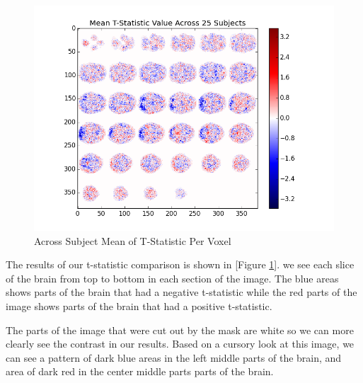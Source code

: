 
\begin{figure}[ht]

\centering

\includegraphics[scale=0.5]{images/hypothesis_testing}  

\caption{Across Subject Mean of T-Statistic Per Voxel}

\label{fig:mask}

\end{figure}


\par \indent The results of our t-statistic comparison is shown in [Figure \ref{fig:mask}]. we see each slice of the brain from top to bottom in each section of the image. The blue areas shows parts of the brain that had a negative t-statistic while the red parts of the image shows parts of the brain that had a positive t-statistic.

\par \indent The parts of the image that were cut out by the mask are white so we can more clearly see the contrast in our results. Based on a cursory look at this image, we can see a pattern of dark blue areas in the left middle parts of the brain, and area of dark red in the center middle parts parts of the brain. 


